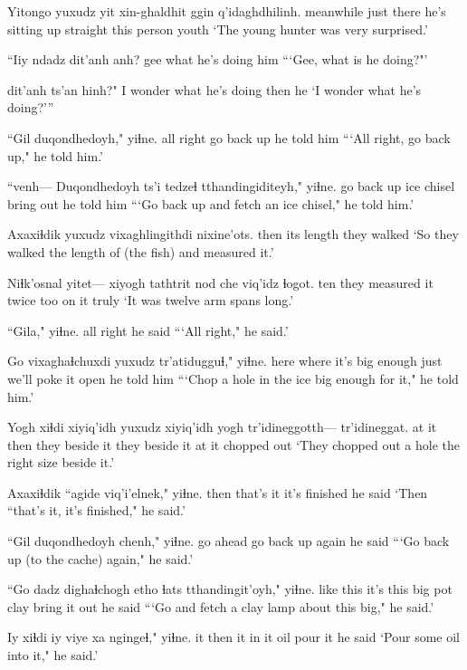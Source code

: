 \documentclass[12pt]{article}
\begin{document}
\gll Yitongo yuxudz yit xin-ghaldhit ggin q'idaghdhilinh.
meanwhile just there {he's sitting up straight} {this person} youth
\glt `The young hunter was very surprised.'
\glend

\gll  ``Iiy ndadz dit'anh anh? 
gee what {he's doing} him 
\glt ```Gee, what is he doing?"'
\glend

 dit'anh ts'an hinh?"
{I wonder what} {he's doing} then he
\glt  `I wonder what he's doing?'''
\glend 

\gll ``Gil duqondhedoyh," yiɬne.
{all right} {go back up} {he told him}
\glt ```All right, go back up," he told him.'
\glend

\gll ``venh--- Duqondhedoyh ts'i tedzeɬ tthandingiditeyh," yiɬne.
{} {go back up} {} {ice chisel} {bring out} {he told him}
\glt ```Go back up and fetch an ice chisel," he told him.'
\glend

\gll Axaxiɬdik yuxudz vixaghlingithdi nixine'ots.
then {} {its length} {they walked}
\glt `So they walked the length of (the fish) and measured it.'
\glend

\gll Niɬk'osnal yitet--- {xiyogh tathtrit} nod che viq'idz ɬogot.
ten {} {they measured it} twice too {on it} truly
\glt `It was twelve arm spans long.'
\glend

\gll ``Gila," yiɬne.
{all right} {he said}
\glt ```All right," he said.'
\glend

\gll Go vixaghaɬchuxdi yuxudz tr'atidugguɬ," yiɬne.
here {where it's big enough} just {we'll poke it open} {he told him}
\glt ```Chop a hole in the ice big enough for it," he told him.'
\glend

\gll Yogh xiɬdi xiyiq'idh yuxudz xiyiq'idh yogh tr'idineggotth--- tr'idineggat.
{at it} then {they beside it} {} {they beside it} {at it} {} {chopped out}
\glt `They chopped out a hole the right size beside it.'
\glend

\gll Axaxiɬdik ``agide viq'i'elnek," yiɬne.
then {that's it} {it's finished} {he said}
\glt `Then ``that's it, it's finished," he said.'
\glend

\gll ``Gil duqondhedoyh chenh," yiɬne.
{go ahead} {go back up} again {he said}
\glt ```Go back up (to the cache) again," he said.'
\glend

\gll ``{Go dadz} dighaɬchogh etho ɬats tthandingit'oyh," yiɬne.
{like this} {it's this big} pot clay {bring it out} {he said}
\glt ```Go and fetch a clay lamp about this big," he said.'
\glend

\gll Iy xiɬdi iy viye xa ngingeɬ," yiɬne.
it then it {in it} oil {pour it} {he said}
\glt `Pour some oil into it," he said.'
\glend
\end{document}
